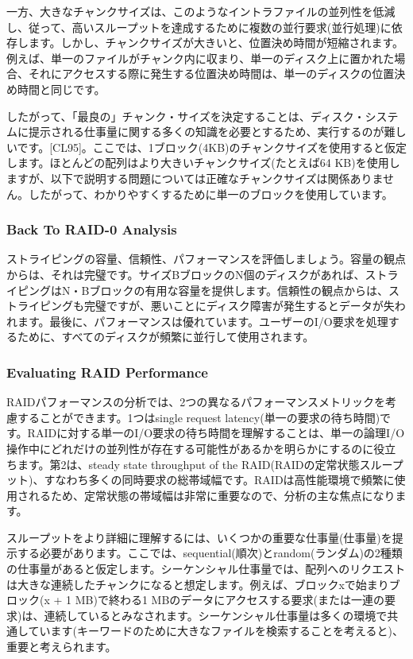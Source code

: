 一方、大きなチャンクサイズは、このようなイントラファイルの並列性を低減し、従って、高いスループットを達成するために複数の並行要求(並行処理)に依存します。しかし、チャンクサイズが大きいと、位置決め時間が短縮されます。例えば、単一のファイルがチャンク内に収まり、単一のディスク上に置かれた場合、それにアクセスする際に発生する位置決め時間は、単一のディスクの位置決め時間と同じです。

したがって、「最良の」チャンク・サイズを決定することは、ディスク・システムに提示される仕事量に関する多くの知識を必要とするため、実行するのが難しいです。{[}CL95{]}。ここでは、1ブロック(4KB)のチャンクサイズを使用すると仮定します。ほとんどの配列はより大きいチャンクサイズ(たとえば64
KB)を使用しますが、以下で説明する問題については正確なチャンクサイズは関係ありません。したがって、わかりやすくするために単一のブロックを使用しています。

\hypertarget{back-to-raid-0-analysis}{%
\subsubsection*{Back To RAID-0 Analysis}\label{back-to-raid-0-analysis}}

ストライピングの容量、信頼性、パフォーマンスを評価しましょう。容量の観点からは、それは完璧です。サイズBブロックのN個のディスクがあれば、ストライピングはN・Bブロックの有用な容量を提供します。信頼性の観点からは、ストライピングも完璧ですが、悪いことにディスク障害が発生するとデータが失われます。最後に、パフォーマンスは優れています。ユーザーのI/O要求を処理するために、すべてのディスクが頻繁に並行して使用されます。

\hypertarget{evaluating-raid-performance}{%
\subsubsection*{Evaluating RAID
Performance}\label{evaluating-raid-performance}}

RAIDパフォーマンスの分析では、2つの異なるパフォーマンスメトリックを考慮することができます。1つはsingle
request
latency(単一の要求の待ち時間)です。RAIDに対する単一のI/O要求の待ち時間を理解することは、単一の論理I/O操作中にどれだけの並列性が存在する可能性があるかを明らかにするのに役立ちます。第2は、steady
state throughput of the
RAID(RAIDの定常状態スループット)、すなわち多くの同時要求の総帯域幅です。RAIDは高性能環境で頻繁に使用されるため、定常状態の帯域幅は非常に重要なので、分析の主な焦点になります。

スループットをより詳細に理解するには、いくつかの重要な仕事量(仕事量)を提示する必要があります。ここでは、sequential(順次)とrandom(ランダム)の2種類の仕事量があると仮定します。シーケンシャル仕事量では、配列へのリクエストは大きな連続したチャンクになると想定します。例えば、ブロックxで始まりブロック(x
+ 1 MB)で終わる1
MBのデータにアクセスする要求(または一連の要求)は、連続しているとみなされます。シーケンシャル仕事量は多くの環境で共通しています(キーワードのために大きなファイルを検索することを考えると)、重要と考えられます。

